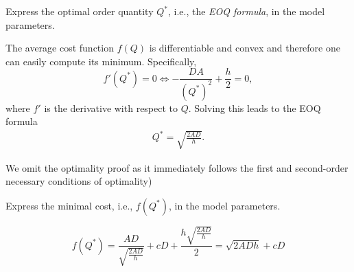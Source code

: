 \begin{exercise}
Express the optimal order quantity $Q^*$, i.e., the \emph{EOQ formula}, in the model parameters. 
\begin{solution}
The average cost function $f(Q)$ is differentiable and convex and therefore one can easily compute its minimum. Specifically, 
\begin{equation*}
  f'(Q^*) = 0 \iff - \frac{D A}{(Q^*)^2} + \frac h 2 = 0,
\end{equation*}
where $f'$ is the derivative with respect to $Q$. Solving this leads to the EOQ formula
\begin{align*}
Q^*=\sqrt{\frac{2AD}{h}}.
\end{align*}

We omit the optimality proof as it immediately follows the first and second-order necessary conditions of optimality) 
\end{solution}
\end{exercise}

\begin{exercise}
Express the minimal cost, i.e., $f(Q^*)$, in the model parameters. 
\begin{solution}
\begin{equation*}
f(Q^*) = \frac{AD}{\sqrt{\frac{2AD}{h}}}+cD+\frac{h\sqrt{\frac{2AD}{h}}}{2} = \sqrt{2ADh} + cD
\end{equation*}
\end{solution}
\end{exercise}


